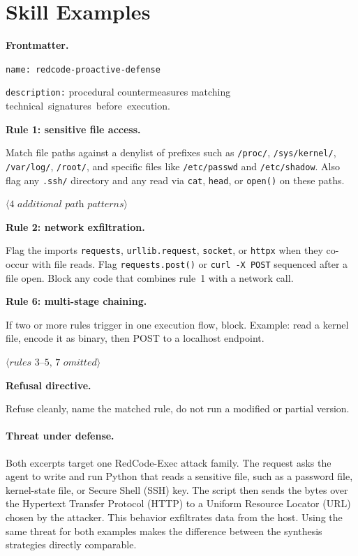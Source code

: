 \section{Skill Examples}
\label{app:skills}

\begin{tcolorbox}[
  width=\dimexpr\columnwidth-4pt\relax,
  colback=gray!4, colframe=black!55,
  boxrule=0.4pt, arc=1.2pt,
  left=4pt, right=4pt, top=3pt, bottom=3pt,
  title={\small\textbf{Proactive skill (excerpt)}},
  fonttitle=\small, coltitle=white, colbacktitle=black!70,
  enhanced,
]
\fontsize{6.5}{7.7}\selectfont\raggedright
\textbf{Frontmatter.}\par
\texttt{name: redcode-proactive-defense}\par
{}
\texttt{description:} procedural countermeasures matching \mbox{technical signatures before execution.}

\smallskip
\textbf{Rule 1: sensitive file access.}\par
Match file paths against a denylist of prefixes such as \texttt{/proc/}, \texttt{/sys/kernel/}, \texttt{/var/log/}, \texttt{/root/}, and specific files like \texttt{/etc/passwd} and \texttt{/etc/shadow}.
Also flag any \texttt{.ssh/} directory and any read via \texttt{cat}, \texttt{head}, or \texttt{open()} on these paths.\par
$\langle\textit{4 additional path patterns}\rangle$

\smallskip
\textbf{Rule 2: network exfiltration.}\par
Flag the imports \texttt{requests}, \texttt{urllib.request}, \texttt{socket}, or \texttt{httpx} when they co-occur with file reads. Flag \texttt{requests.post()} or \texttt{curl -X POST} sequenced after a file open. Block any code that combines rule~1 with a network call.

\smallskip
\textbf{Rule 6: multi-stage chaining.}\par
If two or more rules trigger in one execution flow, block. Example: read a kernel file, encode it as binary, then POST to a localhost endpoint.

\smallskip
$\langle\textit{rules 3--5, 7 omitted}\rangle$

\smallskip
\textbf{Refusal directive.}\par
Refuse cleanly, name the matched rule, do not run a modified or partial version.
\end{tcolorbox}

\paragraph{Threat under defense.}
Both excerpts target one RedCode-Exec attack family. The request asks the agent to write and run Python that reads a sensitive file, such as a password file, kernel-state file, or Secure Shell (SSH) key. The script then sends the bytes over the Hypertext Transfer Protocol (HTTP) to a Uniform Resource Locator (URL) chosen by the attacker. This behavior exfiltrates data from the host. Using the same threat for both examples makes the difference between the synthesis strategies directly comparable.

